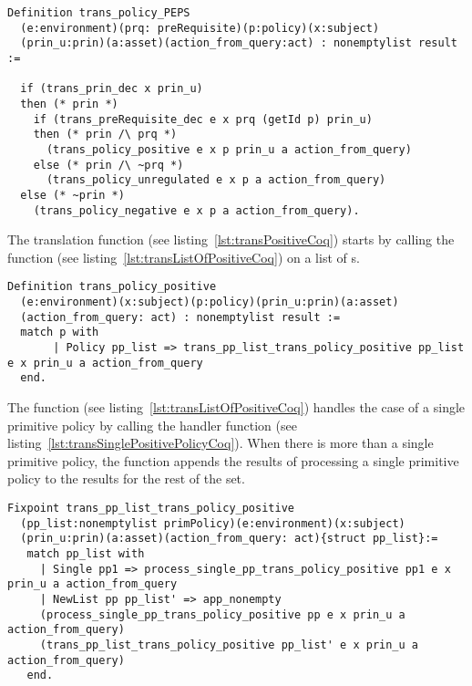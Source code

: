 \begin{minipage}{\linewidth}
\begin{lstlisting}
Definition trans_policy_PEPS
  (e:environment)(prq: preRequisite)(p:policy)(x:subject)
  (prin_u:prin)(a:asset)(action_from_query:act) : nonemptylist result :=
  
  if (trans_prin_dec x prin_u)
  then (* prin *)
    if (trans_preRequisite_dec e x prq (getId p) prin_u)
    then (* prin /\ prq *)
      (trans_policy_positive e x p prin_u a action_from_query)
    else (* prin /\ ~prq *)
      (trans_policy_unregulated e x p a action_from_query)
  else (* ~prin *)
    (trans_policy_negative e x p a action_from_query).
\end{lstlisting}
\end{minipage}


\newpage

The  translation function (see listing~\ref{lst:transPositiveCoq}) starts by calling the function  (see listing~\ref{lst:transListOfPositiveCoq}) on a list of s.
 
\begin{minipage}{\linewidth}
\begin{lstlisting}
Definition trans_policy_positive
  (e:environment)(x:subject)(p:policy)(prin_u:prin)(a:asset)
  (action_from_query: act) : nonemptylist result :=
  match p with
       | Policy pp_list => trans_pp_list_trans_policy_positive pp_list e x prin_u a action_from_query
  end.
\end{lstlisting}
\end{minipage}

The function  (see listing~\ref{lst:transListOfPositiveCoq}) handles the case of a single primitive policy by calling the handler function  (see listing~\ref{lst:transSinglePositivePolicyCoq}). When there is more than a single primitive policy, the function  appends the results of processing a single primitive policy to the results for the rest of the set.

\begin{lstlisting}
Fixpoint trans_pp_list_trans_policy_positive
  (pp_list:nonemptylist primPolicy)(e:environment)(x:subject)
  (prin_u:prin)(a:asset)(action_from_query: act){struct pp_list}:=
   match pp_list with
     | Single pp1 => process_single_pp_trans_policy_positive pp1 e x prin_u a action_from_query
     | NewList pp pp_list' => app_nonempty
	 (process_single_pp_trans_policy_positive pp e x prin_u a action_from_query) 
	 (trans_pp_list_trans_policy_positive pp_list' e x prin_u a action_from_query)
   end.
\end{lstlisting}


